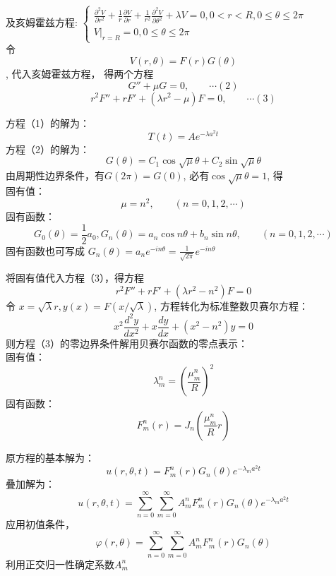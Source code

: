 \begin{frame}
	及亥姆霍兹方程:
	$\left\{
	\begin{array}{l}
		\frac{\partial^{2} V}{\partial r^{2}}+\frac{1}{r} \frac{\partial V}{\partial r}+\frac{1}{r^{2}} 
		\frac{\partial^{2} V}{\partial \theta^{2}}+\lambda V=0, 0<r<R, 
		0 \leq \theta \leq 2 \pi \\
		\left.V\right|_{r=R}=0, 0 \leq \theta \leq 2 \pi
		\end{array}
	\right.$\\
	令\[V(r, \theta) =F(r)G(\theta)\], 代入亥姆霍兹方程， 得两个方程\\
	\[G''+\mu G=0, \qquad \cdots (2) \]
	\[r^2 F''+r F' +(\lambda r^2 -\mu )F=0, \qquad \cdots (3) \]
\end{frame}	

\begin{frame}
	方程（1）的解为：\[T(t)=Ae^{-\lambda a^2 t}\]
	方程（2）的解为：\[G(\theta)=C_1\cos\sqrt{\mu}\theta + C_2\sin \sqrt{\mu}\theta \]
	由周期性边界条件，有$G(2\pi)=G(0)$, 必有$\cos \sqrt{\mu}\theta =1 $, 得\\
	固有值：
	\[\mu = n^2, \qquad (n=0,1,2,\cdots)\]
	固有函数：
	\[G_0(\theta)=\frac{1}{2}a_0, G_n(\theta)= a_n\cos n \theta + b_n \sin n \theta, \qquad (n=0,1,2,\cdots)\]
	固有函数也可写成 $ G_n(\theta)=a_n e^{-i n \theta} =\frac{1}{\sqrt{2\pi}} e^{-i n \theta}$
\end{frame}	

\begin{frame}
	将固有值代入方程（3），得方程 
	\[r^2 F''+r F' +(\lambda r^2 -n^2 )F=0 \]
	令 $x=\sqrt{\lambda} r, y(x)=F(x/\sqrt{\lambda})$, 
	方程转化为标准整数贝赛尔方程：
	\begin{equation*}
		x^2\frac{d^2y}{dx^2} + x\frac{dy}{dx} +(x^2 -n^2)y=0
	\end{equation*}
	则方程（3）的零边界条件解用贝赛尔函数的零点表示：\\
	固有值：
	\[\lambda_m ^n =(\frac{\mu_{m}^{n}}{R})^2 \]
	固有函数：\[F_m ^n(r) = J_n (\frac{\mu_{m}^{n}}{R}r) \]
\end{frame}	
\begin{frame}
	原方程的基本解为：
	\begin{equation*}
		u(r,\theta,t) =F_m ^n (r) G_n(\theta) e^{-\lambda_m a^2 t}
	\end{equation*}
	叠加解为：
	\begin{equation*}
		u(r,\theta,t) =\sum_{n=0}^{\infty} \sum_{m=0}^{\infty} A_m ^n F_m ^n (r) G_n(\theta) e^{-\lambda_m a^2 t}
	\end{equation*}
	应用初值条件， 
	\begin{equation*}
		\varphi(r, \theta)=\sum_{n=0}^{\infty} \sum_{m=0}^{\infty} A_m ^n F_m ^n (r) G_n(\theta) 
	\end{equation*}
	利用正交归一性确定系数$A_m ^n$
\end{frame}	

